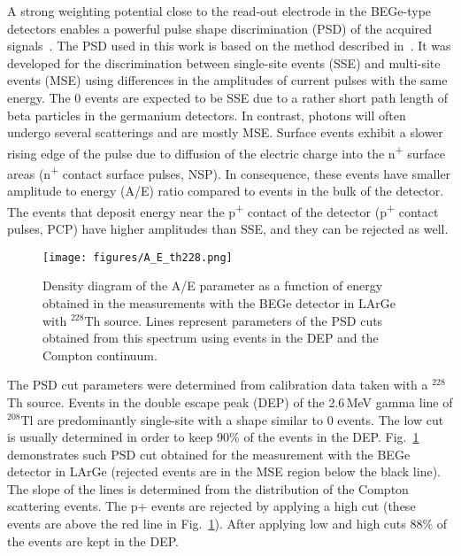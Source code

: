 \documentclass[twocolumn,epjc3]{svjour3}
\newcommand{\bbno} {{0\textnu\textbeta\textbeta\xspace}}
\newcommand{\LArGe} {{{LArGe}\xspace}}
\newcommand{\I}[2]{$^{#1}$#2}
\newcommand{\ts}{\textsuperscript}
\begin{document}
A strong weighting potential close to the read-out electrode in the BEGe-type detectors enables a powerful pulse shape discrimination (PSD) of the acquired signals~\cite{psd_sim}. The PSD used in this work is based on the method described in~\cite{psd}. It was developed for the discrimination between single-site events (SSE) and multi-site events (MSE) using differences in the amplitudes of current pulses with the same energy. The \bbno{} events are expected to be SSE due to a rather short path length of beta particles in the germanium detectors. In contrast, photons will often undergo several scatterings and are mostly MSE. Surface events exhibit a slower rising edge of the pulse due to diffusion of the electric charge into the n\ts{+} surface areas (n\ts{+} contact surface pulses, NSP). In consequence, these events have smaller amplitude to energy (A/E) ratio compared to events in the bulk of the detector. The events that deposit energy near the p\ts{+} contact of the detector (p\ts{+} contact pulses, PCP) have higher amplitudes than SSE, and they can be rejected as well.
\begin{figure}
  \begin{center}
    \texttt{[image: figures/A\_E\_th228.png]}
    \caption{\label{fig:ae_th228} Density diagram of the A/E parameter as a function of energy obtained in the measurements with the BEGe detector in \LArGe{} with \I{228}{Th} source. Lines represent parameters of the PSD cuts obtained from this spectrum using events in the DEP and the Compton continuum.}
  \end{center}
\end{figure}
%

The PSD cut parameters were determined from calibration data taken with a \I{228}{Th} source. Events in the double escape peak (DEP) of the 2.6\,MeV gamma line of \I{208}{Tl} are predominantly single-site with a shape similar to \bbno{} events. The low cut is usually determined in order to keep 90\% of the events in the DEP. Fig.~\ref{fig:ae_th228} demonstrates such PSD cut obtained for the measurement with the BEGe detector in \LArGe{} (rejected events are in the MSE region below the black line). The slope of the lines is determined from the distribution of the Compton scattering events. The p+ events are rejected by applying a high cut (these events are above the red line in Fig.~\ref{fig:ae_th228}). After applying low and high cuts 88\% of the events are kept in the DEP. 
\end{document}
